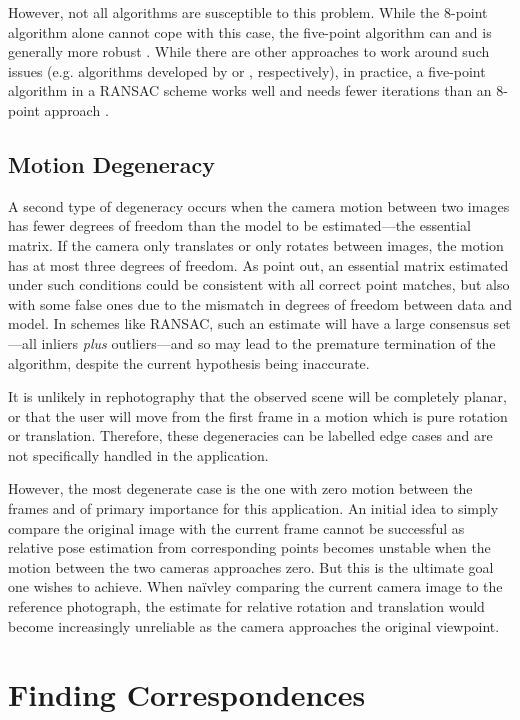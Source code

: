 However, not all algorithms are susceptible to this problem. While the 8-point
algorithm alone cannot cope with this case, the five-point algorithm can and is
generally more robust \citep{li2006}. While there are other approaches to work
around such issues (e.g. algorithms developed by \citet{chum2005} or
\citet{decker2008}, respectively), in practice, a five-point algorithm in a RANSAC scheme
works well and needs fewer iterations than an 8-point approach \citep{li2006}.

\subsection{Motion Degeneracy}
\label{subsec:motion_degen}

A second type of degeneracy occurs when the camera motion between two images has
fewer degrees of freedom than the model to be estimated---the essential matrix.
If the camera only translates or only rotates between images, the motion has
at most three degrees of freedom. As \citet{decker2008} point out, an
essential matrix estimated under such conditions could be consistent with all
correct point matches, but also with some false ones due to the mismatch in
degrees of freedom between data and model. In schemes like RANSAC, such an
estimate will have a large consensus set---all inliers \emph{plus}
outliers---and so may lead to the premature termination of the algorithm,
despite the current hypothesis being inaccurate.

It is unlikely in rephotography that the observed scene will be completely
planar, or that the user will move from the first frame in a motion which is
pure rotation or translation. Therefore, these degeneracies can be labelled edge
cases and are not specifically handled in the application.

However, the most degenerate case is the one with zero motion between the frames
and of primary importance for this application. An initial idea to simply
compare the original image with the current frame cannot be successful as
relative pose estimation from corresponding points becomes unstable when the
motion between the two cameras approaches zero. But this is the ultimate goal one
wishes to achieve. When na\"ivley comparing the current camera
image to the reference photograph, the estimate for relative rotation and
translation would become increasingly unreliable as the camera approaches the
original viewpoint.  

\section{Finding Correspondences}

